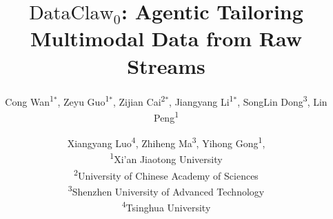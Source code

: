\documentclass{article}
\title{$\text{DataClaw}_0$: Agentic Tailoring Multimodal Data from Raw Streams}
\author{
Cong Wan\textsuperscript{1}$^\ast$,
Zeyu Guo\textsuperscript{1}$^\ast$,
Zijian Cai\textsuperscript{2}$^\ast$,
Jiangyang Li\textsuperscript{1}$^\ast$,
SongLin Dong\textsuperscript{3},
Lin Peng\textsuperscript{1}
\and
Xiangyang Luo\textsuperscript{4},
Zhiheng Ma\textsuperscript{3},
Yihong Gong\textsuperscript{1},
\\[0.8em]
\textsuperscript{1}Xi'an Jiaotong University\\
\textsuperscript{2}University of Chinese Academy of Sciences\\
\textsuperscript{3}Shenzhen University of Advanced Technology\\
\textsuperscript{4}Tsinghua University
}
\begin{document}
\maketitle









\clearpage




\medskip



%     
%     





\clearpage
\appendix




\clearpage
% 
\end{document}
